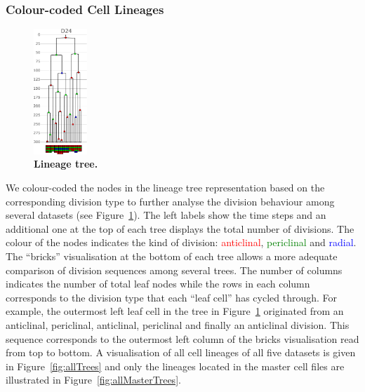\documentclass[11pt,a4paper, final]{article}
\begin{document}
\subsubsection{Colour-coded Cell Lineages}
\noindent
%
\begin{figure}
\vspace{-20pt}
	\begin{center}
	\includegraphics[width=0.18\textwidth]{images/cellLineage.pdf}
	\end{center}
\vspace{-20pt}
\caption[Colour-coded lineage tree.]{\bf Lineage tree.}
\vspace{-10pt}
\label{fig:cellLineage}
\end{figure}
%
We colour-coded the nodes in the lineage tree representation based on the corresponding division type to further analyse the division behaviour among several datasets (see Figure~\ref{fig:cellLineage}). The left labels show the time steps and an additional one at the top of each tree displays the total number of divisions. The colour of the nodes indicates the kind of division: \textcolor{red}{anticlinal}, \textcolor{green}{periclinal} and \textcolor{blue}{radial}. The ``bricks'' visualisation at the bottom of each tree allows a more adequate comparison of division sequences among several trees. The number of columns indicates the number of total leaf nodes while the rows in each column corresponds to the division type that each ``leaf cell'' has cycled through. For example, the outermost left leaf cell in the tree in Figure~\ref{fig:cellLineage} originated from an anticlinal, periclinal, anticlinal, periclinal and finally an anticlinal division. This sequence corresponds to the outermost left column of the bricks visualisation read from top to bottom. A visualisation of all cell lineages of all five datasets is given in Figure~\ref{fig:allTrees} and only the lineages located in the master cell files are illustrated in Figure~\ref{fig:allMasterTrees}.
\end{document}
